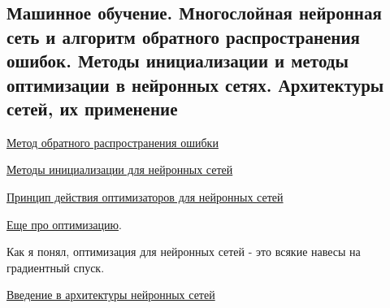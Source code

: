 \subsection{Машинное обучение. Многослойная нейронная сеть и алгоритм обратного распространения ошибок. Методы инициализации и методы оптимизации в нейронных сетях. Архитектуры сетей, их применение}

\href{https://ru.wikipedia.org/wiki/%D0%9C%D0%B5%D1%82%D0%BE%D0%B4_%D0%BE%D0%B1%D1%80%D0%B0%D1%82%D0%BD%D0%BE%D0%B3%D0%BE_%D1%80%D0%B0%D1%81%D0%BF%D1%80%D0%BE%D1%81%D1%82%D1%80%D0%B0%D0%BD%D0%B5%D0%BD%D0%B8%D1%8F_%D0%BE%D1%88%D0%B8%D0%B1%D0%BA%D0%B8}{Метод обратного распространения ошибки}

\href{https://machinelearningmastery.ru/initialization-techniques-for-neural-networks-f4ce8e64effc/}{Методы инициализации для нейронных сетей}

\href{https://habr.com/ru/company/skillfactory/blog/552394/}{Принцип действия оптимизаторов для нейронных сетей}

\href{https://habr.com/ru/post/318970/}{Еще про оптимизацию}.

Как я понял, оптимизация для нейронных сетей - это всякие навесы на градиентный спуск.

\href{https://habr.com/ru/company/oleg-bunin/blog/340184/}{Введение в архитектуры нейронных сетей}